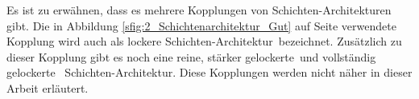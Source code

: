 Es ist zu erwähnen, dass es mehrere Kopplungen von Schichten-Architekturen gibt. Die in Abbildung \ref{sfig:2_Schichtenarchitektur_Gut} auf Seite \pageref{sfig:2_Schichtenarchitektur_Gut} verwendete Kopplung wird auch als \glqq lockere Schichten-Architektur\grqq\ bezeichnet. Zusätzlich zu dieser Kopplung gibt es noch eine \glqq reine\grqq , \glqq stärker gelockerte\grqq\ und \glqq vollständig gelockerte \grqq\ Schichten-Architektur. Diese Kopplungen werden nicht näher in dieser Arbeit erläutert.